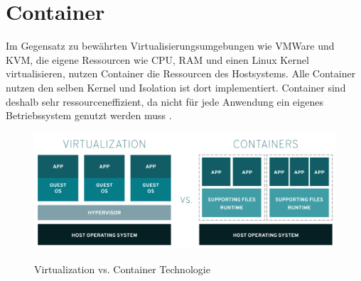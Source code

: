 \section{Container}
\label{sec:grundlagen:container}

Im Gegensatz zu bewährten Virtualisierungsumgebungen wie VMWare und KVM, 
die eigene Ressourcen wie CPU, RAM und einen Linux Kernel virtualisieren,
nutzen Container die Ressourcen des Hostsystems. 
Alle Container nutzen den selben Kernel und Isolation ist dort implementiert.
Container sind deshalb sehr ressourceneffizient, da nicht für jede Anwendung ein eigenes
Betriebssystem genutzt werden muss \cite{Kane2018}.

\begin{figure}
  \includegraphics[width=\textwidth]{gfx/chapters/2_grundlagen/virtualization-vs-containers.png}
  \label{fig:container:vergleich}
  \caption{Virtualization vs. Container Technologie}
\end{figure}